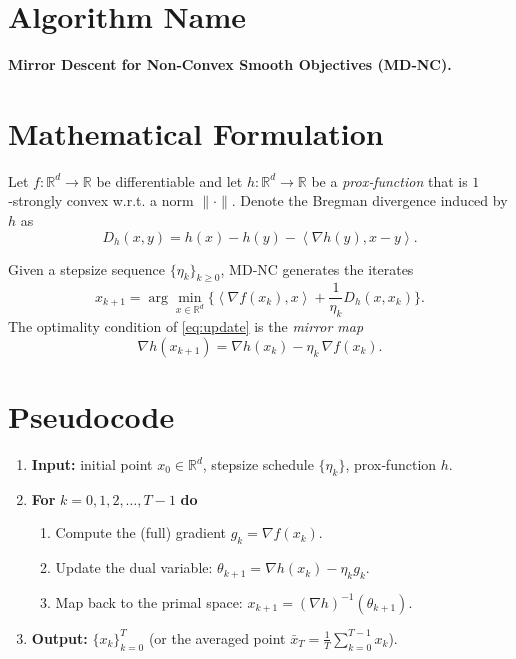 \documentclass{article}
\newcommand{\breg}[2]{D_{h}\!\left(#1,#2\right)}
\newcommand{\inner}[2]{\left\langle #1,#2\right\rangle}
\newcommand{\gradf}{\nabla f}
\newcommand{\gradh}{\nabla h}
\begin{document}
\section*{Algorithm Name}
\textbf{Mirror Descent for Non‑Convex Smooth Objectives (MD‑NC).}

\section*{Mathematical Formulation}
Let $f:\mathbb{R}^{d}\rightarrow\mathbb{R}$ be differentiable and let $h:\mathbb{R}^{d}\rightarrow\mathbb{R}$ be a \emph{prox‑function} that is $1$‑strongly convex w.r.t. a norm $\|\cdot\|$.
Denote the Bregman divergence induced by $h$ as  
\[
\breg{x}{y}=h(x)-h(y)-\inner{\gradh(y)}{x-y}.
\]

Given a stepsize sequence $\{\eta_k\}_{k\ge 0}$, MD‑NC generates the iterates
\begin{equation}
\label{eq:update}
x_{k+1}= \arg\min_{x\in\mathbb{R}^{d}}\Big\{\inner{\gradf(x_k)}{x}
+\frac{1}{\eta_k}\breg{x}{x_k}\Big\}.
\end{equation}
The optimality condition of \eqref{eq:update} is the \emph{mirror map}
\begin{equation}
\label{eq:mirrormap}
\gradh(x_{k+1})=\gradh(x_k)-\eta_k\,\gradf(x_k).
\end{equation}

\section*{Pseudocode}
\begin{enumerate}[leftmargin=*,label={\bf Step \arabic*:}]
\item \textbf{Input:} initial point $x_0\in\mathbb{R}^d$, stepsize schedule $\{\eta_k\}$, prox‑function $h$.
\item \textbf{For} $k=0,1,2,\dots,T-1$ \textbf{do}
\begin{enumerate}[label=\roman*.]
\item Compute the (full) gradient $g_k=\gradf(x_k)$.
\item Update the dual variable: $\displaystyle \theta_{k+1}= \gradh(x_k)-\eta_k g_k$.
\item Map back to the primal space: $x_{k+1}= (\gradh)^{-1}(\theta_{k+1})$.
\end{enumerate}
\item \textbf{Output:} $\{x_k\}_{k=0}^{T}$ (or the averaged point $\bar x_T=\frac1T\sum_{k=0}^{T-1}x_k$).
\end{enumerate}
\end{document}

